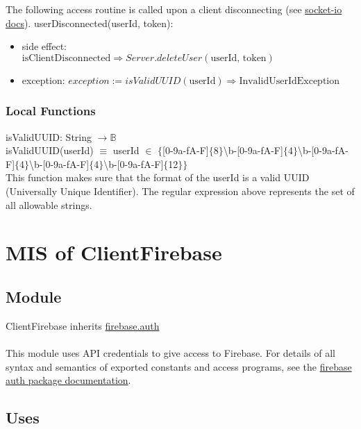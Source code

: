 \documentclass[12pt, titlepage]{article}
\begin{document}
The following access routine is called upon a client disconnecting (see \href{https://socket.io/docs/v4/client-socket-instance/#disconnect}{socket-io docs}). 
\noindent userDisconnected(userId, token):
\begin{itemize}
\item side effect: \\
$\text{isClientDisconnected} \Rightarrow Server.deleteUser(\text{userId, token})$ 

\item exception: $exception := isValidUUID(\text{userId}) \Rightarrow \text{InvalidUserIdException}$ 
\end{itemize}

\subsubsection{Local Functions}

isValidUUID: String $\rightarrow \mathbb{B}$  \\
isValidUUID(userId) $\equiv$ userId $\in$ $\{$[0-9a-fA-F]$\{$8$\}$\textbackslash b-[0-9a-fA-F]$\{$4$\}$\textbackslash b-[0-9a-fA-F]$\{$4$\}$\textbackslash b-[0-9a-fA-F]$\{$4$\}$\textbackslash b-[0-9a-fA-F]$\{$12$\}$$\}$ \\
This function makes sure that the format of the userId is a valid UUID (Universally Unique Identifier). The regular expression above represents the set of all allowable strings.  \\
  
\medskip
\newpage
\section{MIS of ClientFirebase} \label{ClientFirebase} 

\subsection{Module}

ClientFirebase inherits \href{https://firebase.google.com/docs/reference/js/auth}{firebase.auth} \\ \\
This module uses API credentials to give access to Firebase. For details of all syntax and semantics of exported constants and access programs, see the \href{https://firebase.google.com/docs/reference/js/auth}{firebase auth package documentation}.
\subsection{Uses}
\end{document}
